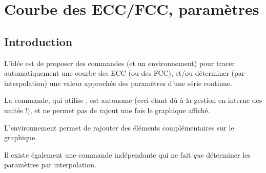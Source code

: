 \begin{PresCodePL}{}

\end{PresCodePL}

\newpage

\section{Courbe des ECC/FCC, paramètres}\label{eccfcc}

\subsection{Introduction}

\begin{tipblock}
 L'idée est de proposer des commandes (et un environnement) pour tracer automatiquement une courbe des ECC (ou des FCC), et/ou déterminer (par interpolation) une valeur approchée des paramètres d'une série continue.

\smallskip

La commande, qui utilise \TikZ, est autonome (ceci étant dû à la gestion en interne des unités !), et ne permet pas de rajout une fois le graphique affiché.

\smallskip

L'environnement permet de rajouter des éléments complémentaires sur le graphique.

\smallskip

Il existe également une commande indépendante qui ne fait \textit{que} déterminer les paramètres par interpolation.
\end{tipblock}

